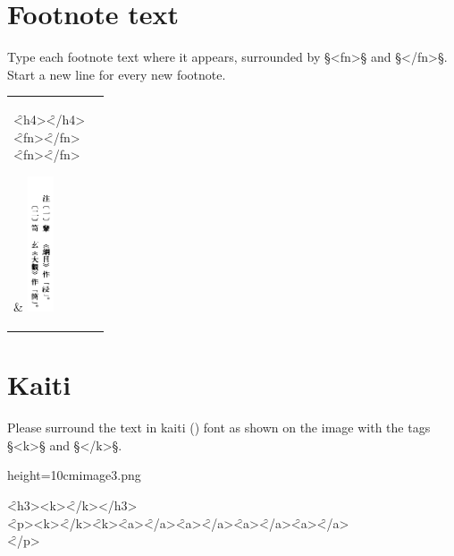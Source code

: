 \documentclass[fontsize=11pt, paper=a4, 
  DIV15,
  normalheadings,
  parskip=half-, 
  pointlessnumbers]{scrartcl}
\begin{document}
\section{Footnote text}
\begin{mainrule}
  Type each footnote text where it appears, surrounded by §<fn>§ and
  §</fn>§. Start a new line for every new footnote.
\end{mainrule}
\vspace{3mm}

\begin{tabular}{@{}ll}
\parbox[b]{131mm}{
  \begin{typeChinese}
    \f{<h4>}\f{</h4>}\\
    \f{<fn>}\f{</fn>}\\
    \f{<fn>}\f{</fn>}
  \end{typeChinese}
} & 
\includegraphics[height=4cm]{image2}
\end{tabular}


\section{Kaiti }
\begin{mainrule}
  Please surround the text in kaiti () font as shown on the image with the tags §<k>§ and §</k>§.
\end{mainrule}
\vspace{3mm}

\begin{sampleImageSmall}{height=10cm}{image3.png}
\hspace{-25mm}
  \begin{typeChinese}
 \f{<h3><k>}\f{</k></h3>}\\
 \f{<p><k>}\f{</k>}\untranscribedText{}\f{<k>}\f{<a>}\f{</a>}\f{<a>}\f{</a>}\untranscribedText{}\f{<a>}\f{</a>}\untranscribedText{}\f{<a>}\f{</a>}\\
\someText \f{</p>}
  \end{typeChinese}
\end{sampleImageSmall}
\end{document}
